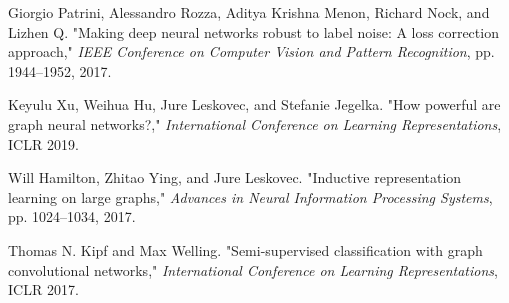 \documentclass[portrait,final,a0paper,fontscale=0.365]{baposter}
\begin{document}
\begin{poster}
{\begin{thebibliography}{1}
       Giorgio Patrini, Alessandro Rozza, Aditya Krishna Menon, Richard Nock, and Lizhen Q. "Making deep neural networks robust to label noise: A loss correction approach," \textit{IEEE Conference on Computer Vision and Pattern Recognition}, pp.
      1944–1952, 2017.

       Keyulu Xu, Weihua Hu, Jure Leskovec, and Stefanie Jegelka. "How powerful are graph neural networks?," \textit{International Conference on Learning Representations}, ICLR 2019.

       Will Hamilton, Zhitao Ying, and Jure Leskovec. "Inductive representation learning on large graphs," \textit{Advances in Neural Information Processing Systems}, pp. 1024–1034, 2017.

       Thomas N. Kipf and Max Welling. "Semi-supervised classification with graph convolutional networks," \textit{International Conference on Learning Representations}, ICLR 2017.
   \end{thebibliography}
}

\end{poster}
\end{document}

